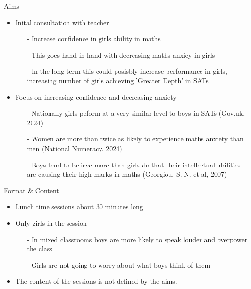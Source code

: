 \documentclass{beamer}  %
\begin{document}
\begin{frame}{Aims}
    \begin{itemize}
        \item Inital consultation with teacher
        \begin{itemize}
            \item[-]Increase confidence in girls ability in maths
            \item[-] This goes hand in hand with decreasing maths anxiey in girls
            \item[-] In the long term this could posisbly increase performance in girls, increasing number of girls achieving 'Greater Depth' in SATs
        \end{itemize}
        \item Focus on increasing confidence and decreasing anxiety
        \begin{itemize}
            \item[-]Nationally girls peform at a very similar level to boys in SATs (Gov.uk, 2024)
            \item[-]Women are more than twice as likely to experience maths anxiety than men (National Numeracy, 2024) 
            \item[-] Boys tend to believe more than girls do that their intellectual abilities are causing their high marks in maths (Georgiou, S. N. et al, 2007)
        \end{itemize}
    \end{itemize}
\end{frame}

\begin{frame}{Format \& Content}
    \begin{itemize}
        \item Lunch time sessions about 30 minutes long
        \item Only girls in the session
        \begin{itemize}
            \item[-] In mixed classrooms boys are more likely to speak louder and overpower the class
            \item[-] Girls are not going to worry about what boys think of them
        \end{itemize}
        \item The content of the sessions is not defined by the aims.
    \end{itemize}
\end{frame}
\end{document}
